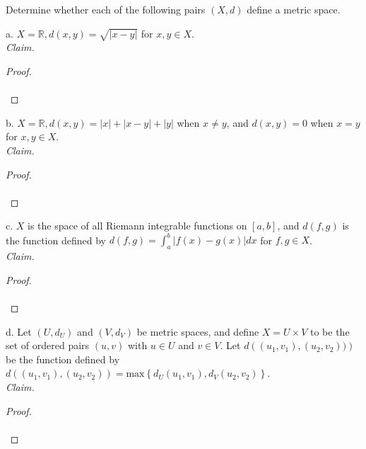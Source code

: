 Determine whether each of the following pairs $(X, d)$ define a metric space.

a.  $X = \mathbb{R}, d(x, y) = \sqrt{|x - y|}$ for $x, y \in X$. \ \\

    \emph{Claim.} 
    \ \\

    \begin{proof}\renewcommand{\qedsymbol}{}\ \\\\
    \end{proof}

    \pagebreak

b.  $X = \mathbb{R}, d(x, y) = |x| + |x - y| + |y|$ when $x \neq y$, and 
    $d(x, y) = 0$ when $x = y$ for $x, y \in X$. \ \\

    \emph{Claim.} 
    \ \\

    \begin{proof}\renewcommand{\qedsymbol}{}\ \\\\
    \end{proof}

    \pagebreak

c.  $X$ is the space of all Riemann integrable functions on $[a, b]$, and 
    $d(f, g)$ is the function defined by 
    $d(f, g) = \int_a^b{|f(x) - g(x)|dx}$ for $f, g \in X$. \ \\

    \emph{Claim.} 
    \ \\

    \begin{proof}\renewcommand{\qedsymbol}{}\ \\\\
    \end{proof}

    \pagebreak

d.  Let $(U, d_U)$ and $(V, d_V)$ be metric spaces, and define $X = U \times V$
    to be the set of ordered pairs $(u, v)$ with $u \in U$ and $v \in V$.
    Let $d\left((u_1, v_1), (u_2, v_2))\right)$ be the function defined by
    $d\left((u_1, v_1), (u_2, v_2)\right) 
     = \text{max}\left\{d_U(u_1, v_1), d_V(u_2, v_2)\right\}$. \ \\
    
     \emph{Claim.} 
    \ \\

    \begin{proof}\renewcommand{\qedsymbol}{}\ \\\\
    \end{proof}

    \pagebreak